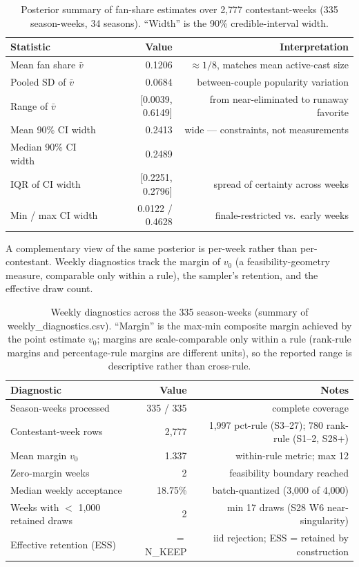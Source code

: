 \documentclass{article}
\begin{document}
\begin{table}[H]
\centering
\caption{Posterior summary of fan-share estimates over 2{,}777 contestant-weeks (335 season-weeks, 34 seasons). ``Width'' is the 90\% credible-interval width.}
\label{tab:m1-stats}
\begin{tabular}{lrr}
\toprule
Statistic & Value & Interpretation \\
\midrule
Mean fan share $\bar v$ & 0.1206 & $\approx 1/8$, matches mean active-cast size \\
Pooled SD of $\bar v$ & 0.0684 & between-couple popularity variation \\
Range of $\bar v$ & [0.0039, 0.6149] & from near-eliminated to runaway favorite \\
Mean 90\% CI width & 0.2413 & wide --- constraints, not measurements \\
Median 90\% CI width & 0.2489 & \\
IQR of CI width & [0.2251, 0.2796] & spread of certainty across weeks \\
Min / max CI width & 0.0122 / 0.4628 & finale-restricted vs.\ early weeks \\
\bottomrule
\end{tabular}
\end{table}

A complementary view of the same posterior is per-week rather than per-contestant. Weekly diagnostics track the margin of $v_0$ (a feasibility-geometry measure, comparable only within a rule), the sampler's retention, and the effective draw count.

\begin{table}[H]
\centering
\caption{Weekly diagnostics across the 335 season-weeks (summary of weekly\_diagnostics.csv). ``Margin'' is the max-min composite margin achieved by the point estimate $v_0$; margins are scale-comparable only within a rule (rank-rule margins and percentage-rule margins are different units), so the reported range is descriptive rather than cross-rule.}
\label{tab:m1-weekly}
\begin{tabular}{lrr}
\toprule
Diagnostic & Value & Notes \\
\midrule
Season-weeks processed & 335 / 335 & complete coverage \\
Contestant-week rows & 2{,}777 & 1{,}997 pct-rule (S3--27); 780 rank-rule (S1--2, S28+) \\
Mean margin $v_0$ & 1.337 & within-rule metric; max 12 \\
Zero-margin weeks & 2 & feasibility boundary reached \\
Median weekly acceptance & 18.75\% & batch-quantized (3,000 of 4,000) \\
Weeks with $<$ 1{,}000 retained draws & 2 & min 17 draws (S28 W6 near-singularity) \\
Effective retention (ESS) & $=$ N\_KEEP & iid rejection; ESS = retained by construction \\
\bottomrule
\end{tabular}
\end{table}
\end{document}
